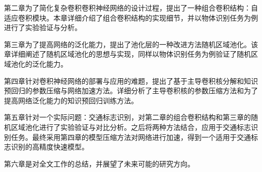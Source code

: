第二章为了简化复杂卷积卷积神经网络的设计过程，提出了一种组合卷积结构：自适应卷积模块。本章详细介绍了组合卷积结构的实现细节，并以物体识别任务为例进行了实验验证与分析。

第三章为了提高网络的泛化能力，提出了池化层的一种改进方法随机区域池化。该章详细阐述了随机区域池化的思想与实现，同样以物体识别任务为例验证了随机区域池化的泛化能力。

第四章针对卷积神经网络的部署与应用的难题，提出了基于主导卷积核分解和知识预回归的参数压缩与网络加速方法。详细分析了主导卷积核的参数压缩方法和为了提高网络泛化能力的知识预回归训练方法。

第五章针对一个实际问题：交通标志识别，对第二章的组合卷积结构和第三章的随机区域池化进行了实验验证与对比分析。之后将两种方法结合，应用于交通标志识别任务。最终采用第四章的模型压缩方法对网络进行加速，得到一个适用于交通标志识别的高精度快速模型。

第六章是对全文工作的总结，并展望了未来可能的研究方向。

